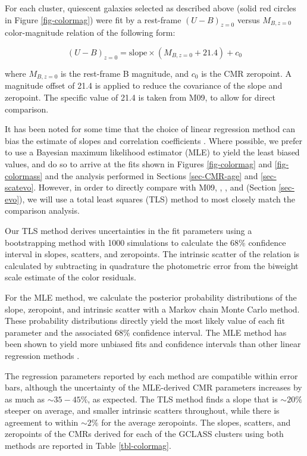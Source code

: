 For each cluster, quiescent galaxies selected as described above (solid red circles in Figure \ref{fig-colormag}) were fit by a rest-frame $(U-B)_{z=0}$ versus $M_{B,z=0}$ color-magnitude relation of the following form:

\begin{equation}\label{eq-colormag}
(U-B)_{z=0} = \textrm{slope} \times (M_{B,z=0} + 21.4) + c_0
\end{equation}

where $M_{B,z=0}$ is the rest-frame B magnitude, and $c_0$ is the CMR zeropoint. A magnitude offset of 21.4 is applied to reduce the covariance of the slope and zeropoint. The specific value of 21.4 is taken from M09, to allow for direct comparison.

It has been noted for some time that the choice of linear regression method can bias the estimate of slopes and correlation coefficients \citep{Kelly:2007sf}. Where possible, we prefer to use a Bayesian maximum likelihood estimator (MLE) to yield the least biased values, and do so to arrive at the fits shown in Figures \ref{fig-colormag} and \ref{fig-colormass} and the analysis performed in Sections \ref{sec-CMR-age} and \ref{sec-scatevo}. However, in order to directly compare with M09, \citet{Bower:1992mb}, \citet{van-Dokkum:1998wd}, and \citet{Ellis:1997lk} (Section \ref{sec-evo}), we will use a total least squares (TLS) method to most closely match the comparison analysis.

Our TLS method derives uncertainties in the fit parameters using a bootstrapping method with 1000 simulations to calculate the 68\% confidence interval in slopes, scatters, and zeropoints. The intrinsic scatter of the relation is calculated by subtracting in quadrature the photometric error from the biweight scale estimate of the color residuals.

For the MLE method, we calculate the posterior probability distributions of the slope, zeropoint, and intrinsic scatter with a Markov chain Monte Carlo method. These probability distributions directly yield the most likely value of each fit parameter and the associated 68\% confidence interval. The MLE method has been shown to yield more unbiased fits and confidence intervals than other linear regression methods \citep{Kelly:2007sf}.

The regression parameters reported by each method are compatible within error bars, although the uncertainty of the MLE-derived CMR parameters increases by as much as $\sim 35 - 45\%$, as expected. The TLS method finds a slope that is $\sim 20\%$ steeper on average, and smaller intrinsic scatters throughout, while there is agreement to within $\sim 2\%$ for the average zeropoints.  The slopes, scatters, and zeropoints of the CMRs derived for each of the GCLASS clusters using both methods are reported in Table \ref{tbl-colormag}.

